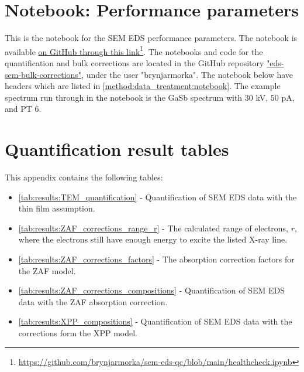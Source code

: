 


\chapter{Notebook: Performance parameters}
\label{appendix:performance}

This is the notebook for the SEM EDS performance parameters.
The notebook is available \href{https://github.com/brynjarmorka/sem-eds-qc/blob/main/healthcheck.ipynb}{on GitHub through this link}\footnote{\url{https://github.com/brynjarmorka/sem-eds-qc/blob/main/healthcheck.ipynb}}. 
The notebooks and code for the quantification and bulk corrections are located in the GitHub repository \href{https://github.com/brynjarmorka/eds-sem-bulk-corrections}{"eds-sem-bulk-corrections"}, under the user "brynjarmorka".
The notebook below have headers which are listed in \cref{method:data_treatment:notebook}.
The example spectrum run through in the notebook is the GaSb spectrum with $30$ kV, $50$ pA, and PT $6$.


\restoregeometry %








\chapter{Quantification result tables}
\label{appendix:tables}

This appendix contains the following tables:

\begin{itemize}
    \item \cref{tab:results:TEM_quantification} - Quantification of SEM EDS data with the thin film assumption.
    \item \cref{tab:results:ZAF_corrections_range_r} - The calculated range of electrons, $r$, where the electrons still have enough energy to excite the listed X-ray line.
    \item \cref{tab:results:ZAF_corrections_factors} - The absorption correction factors for the ZAF model.
    \item \cref{tab:results:ZAF_corrections_compositions} - Quantification of SEM EDS data with the ZAF absorption correction.
    \item \cref{tab:results:XPP_compositions} - Quantification of SEM EDS data with the corrections form the XPP model.    
\end{itemize}

